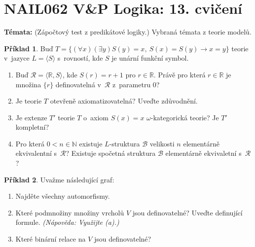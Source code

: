 \documentclass[a4paper]{article}
\theoremstyle{definition}
\newtheorem{problem}{Příklad}
\begin{document}
\section*{NAIL062 V\&P Logika: 13. cvičení}


\textbf{Témata:}
(Zápočtový test z predikátové logiky.) Vybraná témata z teorie modelů.


\medskip\begin{problem}
    Buď $T=\{(\forall x)(\exists y) S(y)=x,\ S(x)=S(y)\to x=y\}$ teorie v~jazyce $L=\langle S\rangle$ s~rovností, kde $S$ je unární funkční symbol.
    \begin{enumerate}
    \item Buď $\mathcal{R}=\langle\mathbb{R},S\rangle$, kde $S(r)=r+1$ pro $r\in\mathbb{R}$. Právě pro která $r\in\mathbb{R}$ je množina $\{r\}$ definovatelná v~$\mathcal{R}$ z~parametru $0$?
    \item Je teorie $T$ otevřeně axiomatizovatelná? Uveďte zdůvodnění.
    \item Je extenze $T'$ teorie $T$ o~axiom $S(x)=x$ $\omega$-kategorická teorie? Je $T'$ kompletní?
    \item Pro která $0<n\in\mathbb{N}$ existuje $L$-struktura $\mathcal{B}$ velikosti $n$ elementárně ekvivalentní s~$\mathcal{R}$? Existuje spočetná struktura $\mathcal{B}$ elementárně ekvivaletní s~$\mathcal{R}$?
    \end{enumerate}
\end{problem}


\medskip\begin{problem}
Uvažme následující graf:
\begin{center}
\end{center}
\begin{enumerate}
    \item Najděte všechny automorfismy.
    \item Které podmnožiny množiny vrcholů $V$ jsou definovatelné? Uveďte definující formule. {\it (Nápověda: Využijte (a).)}
    \item Které binární relace na $V$ jsou definovatelné?
\end{enumerate}
\end{problem}
\end{document}

